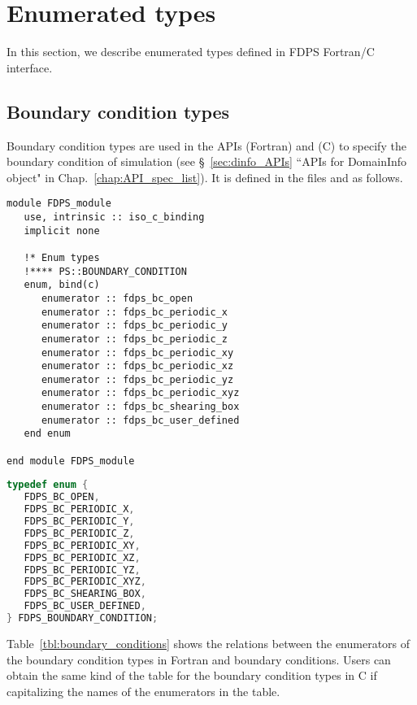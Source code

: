 \section{Enumerated types}
\label{sec:enum_types}
In this section, we describe enumerated types defined in FDPS Fortran/C interface.

\subsection{Boundary condition types}
\label{subsec:enum_bc}
Boundary condition types are used in the APIs  {\small (Fortran)} and  {\small (C)} to specify the boundary condition of simulation (see \S~\ref{sec:dinfo_APIs} ``APIs for DomainInfo object" in Chap.~\ref{chap:API_spec_list}). It is defined in the files  and  as follows.

\begin{lstlisting}[caption=Boundary condition types (Fortran)]
module FDPS_module
   use, intrinsic :: iso_c_binding
   implicit none
   
   !* Enum types
   !**** PS::BOUNDARY_CONDITION
   enum, bind(c)
      enumerator :: fdps_bc_open
      enumerator :: fdps_bc_periodic_x
      enumerator :: fdps_bc_periodic_y
      enumerator :: fdps_bc_periodic_z
      enumerator :: fdps_bc_periodic_xy
      enumerator :: fdps_bc_periodic_xz
      enumerator :: fdps_bc_periodic_yz
      enumerator :: fdps_bc_periodic_xyz
      enumerator :: fdps_bc_shearing_box
      enumerator :: fdps_bc_user_defined
   end enum
   
end module FDPS_module
\end{lstlisting}

\begin{lstlisting}[language=C,caption=Boundary condition types (C)]
typedef enum {
   FDPS_BC_OPEN,
   FDPS_BC_PERIODIC_X,
   FDPS_BC_PERIODIC_Y,
   FDPS_BC_PERIODIC_Z,
   FDPS_BC_PERIODIC_XY,
   FDPS_BC_PERIODIC_XZ,
   FDPS_BC_PERIODIC_YZ,
   FDPS_BC_PERIODIC_XYZ,
   FDPS_BC_SHEARING_BOX,
   FDPS_BC_USER_DEFINED,
} FDPS_BOUNDARY_CONDITION;
\end{lstlisting}


Table~\ref{tbl:boundary_conditions} shows the relations between the enumerators of the boundary condition types in Fortran and boundary conditions. Users can obtain the same kind of the table for the boundary condition types in C if capitalizing the names of the enumerators in the table.

